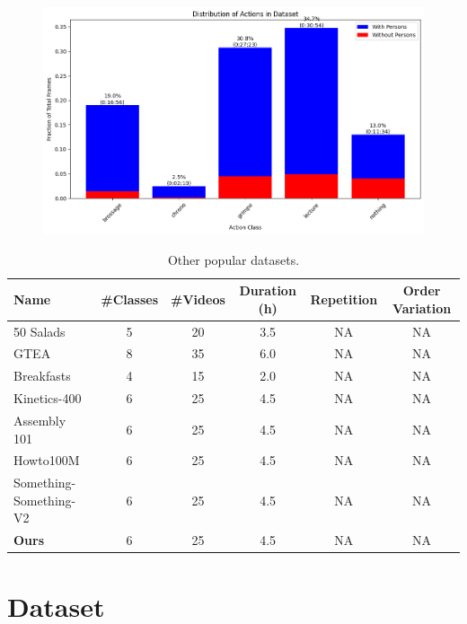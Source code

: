 \begin{figure}[t]
\begin{minipage}{0.245\textwidth}
        \includegraphics[width=\textwidth]{assets/figures/distribution-of-actions-in-dataset.png}
        \label{fig:average-duration-of-actions}
    \end{minipage}%
\end{figure}

\begin{table}[t]
    \centering
    \small
    \renewcommand{\arraystretch}{0.9}
    \setlength{\tabcolsep}{6pt}
    \begin{tabular}{|l|c|c|c|c|c|}
      \hline
      \textbf{Name} & \textbf{\#Classes} & \textbf{\#Videos} & \textbf{Duration (h)} & \textbf{Repetition} & \textbf{Order Variation} \\ \hline
      50 Salads & 5 & 20 & 3.5 & NA & NA \\ \hline
      GTEA & 8 & 35 & 6.0 & NA & NA \\ \hline
      Breakfasts & 4 & 15 & 2.0 & NA & NA \\ \hline
      Kinetics-400 & 6 & 25 & 4.5 & NA & NA \\ \hline
      Assembly 101 & 6 & 25 & 4.5 & NA & NA \\ \hline
      Howto100M & 6 & 25 & 4.5 & NA & NA \\ \hline
      Something-Something-V2 & 6 & 25 & 4.5 & NA & NA \\ \hline
      \textbf{Ours} & 6 & 25 & 4.5 & NA & NA \\ \hline
    \end{tabular}
    \caption{Other popular datasets.}
    \label{tab:dataset_stats}
\end{table}

\section{Dataset}

